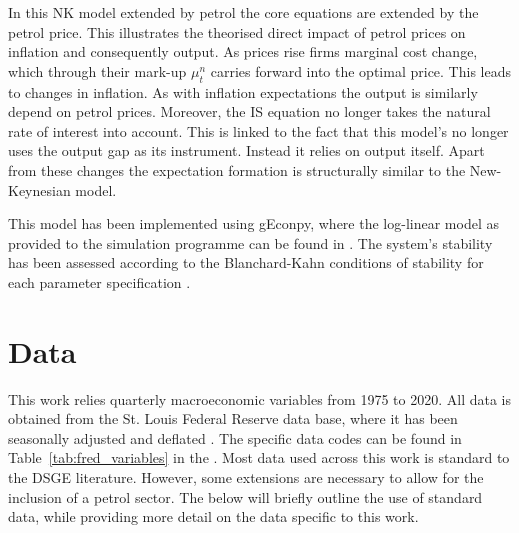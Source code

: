 \documentclass[12pt,a4paper,english]{article} %
\let\oldsection\section
\renewcommand\section{\clearpage\oldsection}
\begin{document}
	In this NK model extended by petrol the core equations are extended by the petrol price. This illustrates the theorised direct impact of petrol prices on inflation and consequently output. As prices rise firms marginal cost change, which through their mark-up $\mu_t^n$ carries forward into the optimal price. This leads to changes in inflation. 
	As with inflation expectations the output is similarly depend on petrol prices. Moreover, the IS equation no longer takes the natural rate of interest into account. This is linked to the fact that this model's no longer uses the output gap as its instrument. Instead it relies on output itself. Apart from these changes the expectation formation is structurally similar to the New-Keynesian model. 
	
	This model has been implemented using gEconpy, where the log-linear model as provided to the simulation programme can be found in . The system's stability has been assessed according to the Blanchard-Kahn conditions of stability for each parameter specification \cite{blanchard_solution_1980}. 
	
	\section{Data}
	This work relies quarterly macroeconomic variables from 1975 to 2020. All data is obtained from the St. Louis Federal Reserve data base, where it has been seasonally adjusted and deflated \cite{noauthor_federal_nodate}. The specific data codes can be found in Table~\ref{tab:fred_variables} in the . Most data used across this work is standard to the DSGE literature. However, some extensions are necessary to allow for the inclusion of a petrol sector. The below will briefly outline the use of standard data, while providing more detail on the data specific to this work.
	
\end{document}
